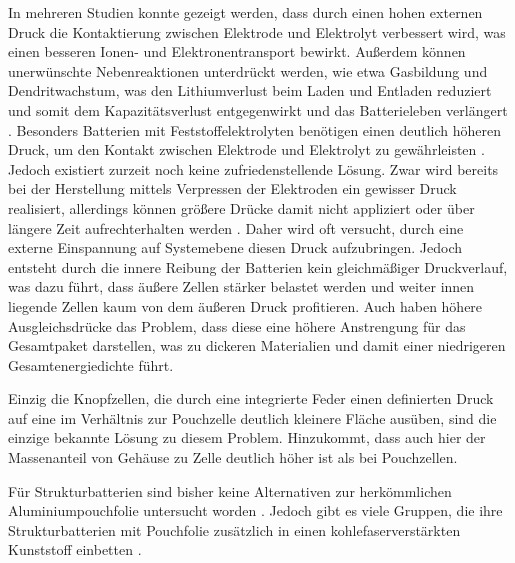 In mehreren Studien konnte gezeigt werden, dass durch einen hohen externen Druck die Kontaktierung zwischen Elektrode und Elektrolyt verbessert wird, was einen besseren Ionen- und Elektronentransport bewirkt. Außerdem können unerwünschte Nebenreaktionen unterdrückt werden, wie etwa Gasbildung und Dendritwachstum, was den Lithiumverlust beim Laden und Entladen reduziert und somit dem Kapazitätsverlust entgegenwirkt und das Batterieleben verlängert \cite{Mussa2018,Mueller2019,Sakamoto2019}. Besonders Batterien mit Feststoffelektrolyten benötigen einen deutlich höheren Druck, um den Kontakt zwischen Elektrode und Elektrolyt zu gewährleisten \cite{Boaretto2021}. Jedoch existiert zurzeit noch keine zufriedenstellende Lösung. Zwar wird bereits bei der Herstellung mittels Verpressen der Elektroden ein gewisser Druck realisiert, allerdings können größere Drücke damit nicht appliziert oder über längere Zeit aufrechterhalten werden \cite{Garayt2023}. Daher wird oft versucht, durch eine externe Einspannung auf Systemebene diesen Druck aufzubringen. Jedoch entsteht durch die innere Reibung der Batterien kein gleichmäßiger Druckverlauf, was dazu führt, dass äußere Zellen stärker belastet werden und weiter innen liegende Zellen kaum von dem äußeren Druck profitieren. Auch haben höhere Ausgleichsdrücke das Problem, dass diese eine höhere Anstrengung für das Gesamtpaket darstellen, was zu dickeren Materialien und damit einer niedrigeren Gesamtenergiedichte führt.

Einzig die Knopfzellen, die durch eine integrierte Feder einen definierten Druck auf eine im Verhältnis zur Pouchzelle deutlich kleinere Fläche ausüben, sind die einzige bekannte Lösung zu diesem Problem. Hinzukommt, dass auch hier der Massenanteil von Gehäuse zu Zelle deutlich höher ist als bei Pouchzellen.

Für Strukturbatterien sind bisher keine Alternativen zur herkömmlichen Aluminiumpouchfolie untersucht worden \cite{Ye2024}. Jedoch gibt es viele Gruppen, die ihre Strukturbatterien mit Pouchfolie zusätzlich in einen kohlefaserverstärkten Kunststoff einbetten \cite{Pattarakunnan2020,Asp2021}.

